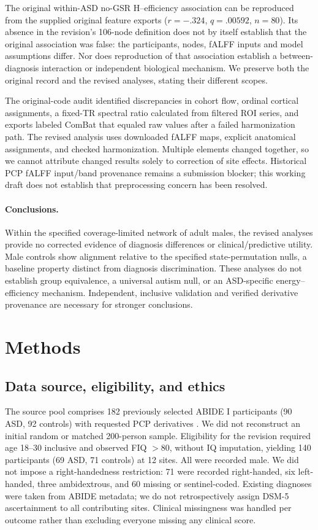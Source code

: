 \documentclass[10pt,letterpaper]{article}
\begin{document}
The original within-ASD no-GSR H--efficiency association can be reproduced from
the supplied original feature exports ($r=-.324$, $q=.00592$, $n=80$). Its absence
in the revision's 106-node definition does not by itself establish that the
original association was false: the participants, nodes, fALFF inputs and model
assumptions differ. Nor does reproduction of that association establish a
between-diagnosis interaction or independent biological mechanism. We preserve
both the original record and the revised analyses, stating their different scopes.

The original-code audit identified discrepancies in cohort flow, ordinal cortical
assignments, a fixed-TR spectral ratio calculated from filtered ROI series, and
exports labeled ComBat that equaled raw values after a failed harmonization path.
The revised analysis uses downloaded fALFF maps, explicit anatomical assignments,
and checked harmonization. Multiple elements changed together, so we cannot
attribute changed results solely to correction of site effects.
Historical PCP fALFF input/band provenance remains a submission blocker; this
working draft does not establish that preprocessing concern has been resolved.

\paragraph*{Conclusions.}
Within the specified coverage-limited network of adult males, the revised analyses
provide no corrected evidence of diagnosis differences or clinical/predictive
utility. Male controls show alignment relative to the specified state-permutation
nulls, a baseline property distinct from diagnosis discrimination. These analyses
do not establish group equivalence, a universal autism null, or
an ASD-specific energy--efficiency mechanism. Independent, inclusive validation
and verified derivative provenance are necessary for stronger conclusions.

\section*{Methods}
\subsection*{Data source, eligibility, and ethics}
The source pool comprises 182 previously selected ABIDE I participants (90 ASD,
92 controls) with requested PCP derivatives \cite{DiMartino:2014abide,PCPdocumentationRevision}.
We did not reconstruct an initial random or matched 200-person sample. Eligibility
for the revision required age 18--30 inclusive and observed FIQ $>80$, without IQ
imputation, yielding 140 participants (69 ASD, 71 controls) at 12 sites. All were
recorded male. We did not impose a right-handedness restriction: 71 were recorded
right-handed, six left-handed, three ambidextrous, and 60 missing or sentinel-coded.
Existing diagnoses were taken from ABIDE metadata; we do not retrospectively assign
DSM-5 ascertainment to all contributing sites. Clinical missingness was handled
per outcome rather than excluding everyone missing any clinical score.
\end{document}
